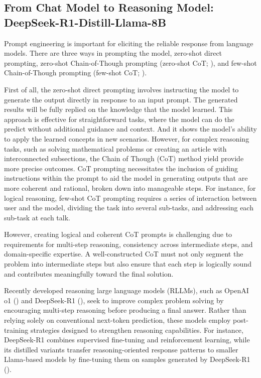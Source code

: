 \subsection*{From Chat Model to Reasoning Model: DeepSeek-R1-Distill-Llama-8B}


Prompt engineering is important for eliciting the reliable response from language models. There are three ways in prompting the model, zero-shot direct prompting, zero-shot Chain-of-Though prompting (zero-shot CoT; \cite{kojima2022large}), and few-shot Chain-of-Though prompting (few-shot CoT; \cite{wei2022chain}).

%
First of all, the zero-shot direct prompting involves instructing the model to generate the output directly in response to an input prompt. The generated results will be fully replied on the knowledge that the model learned. This approach is effective for straightforward tasks, where the model can do the predict without additional guidance and context. And it shows the model's ability to apply the learned concepts in new scenarios. However, for complex reasoning tasks, such as solving mathematical problems or creating an article with interconnected subsections, the Chain of Though (CoT) method yield provide more precise outcomes. CoT prompting necessitates the inclusion of guiding instructions within the prompt to aid the model in generating outputs that are more coherent and rational, broken down into manageable steps. For instance, for logical reasoning, few-shot CoT prompting requires a series of interaction between user and the model, dividing the task into several sub-tasks, and addressing each sub-task at each talk.


However, creating logical and coherent CoT prompts is challenging due to requirements for multi-step reasoning, consistency across intermediate steps, and domain-specific expertise. A well-constructed CoT must not only segment the problem into intermediate steps but also ensure that each step is logically sound and contributes meaningfully toward the final solution. 



Recently developed reasoning large language models (RLLMs), such as OpenAI o1 (\cite{jaech2024openai}) and DeepSeek-R1 (\cite{shao2024deepseekmath}), seek to improve complex problem solving by encouraging multi-step reasoning before producing a final answer. Rather than relying solely on conventional next-token prediction, these models employ post-training strategies designed to strengthen reasoning capabilities. For instance, DeepSeek-R1 combines supervised fine-tuning and reinforcement learning, while its distilled variants transfer reasoning-oriented response patterns to smaller Llama-based models by fine-tuning them on samples generated by DeepSeek-R1 (\cite{guo2025deepseek}).

